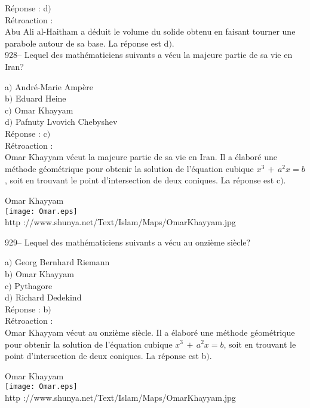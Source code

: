 ﻿\documentclass[letterpaper, 12pt]{article}
\begin{document}
R\'eponse : d$)$\\

R\'etroaction : \\
Abu Ali al-Haitham a d\'eduit le volume du solide obtenu en faisant tourner
une parabole autour de sa base. La r\'eponse est d$)$.\\

928-- Lequel des math\'ematiciens suivants a v\'ecu la majeure
partie de sa vie en Iran?

a$)$ Andr\'e-Marie Amp\`ere \\
b$)$ Eduard Heine \\
c$)$ Omar Khayyam \\
d$)$ Pafnuty Lvovich Chebyshev\\

R\'eponse : c$)$\\

R\'etroaction : \\
Omar Khayyam v\'ecut la majeure partie de sa vie en Iran. Il a
\'elabor\'e une m\'ethode g\'eom\'etrique pour obtenir la solution
de l'\'equation cubique $x^3\,+\,a^2x=b$,
soit en trouvant le point d'intersection de deux coniques. La r\'eponse est
c$)$.\\

        \begin{center}
        Omar Khayyam\\
    \texttt{[image: Omar.eps]}\\
        {\footnotesize http
://www.shunya.net/Text/Islam/Maps/OmarKhayyam.jpg}
    \end{center}

929-- Lequel des math\'ematiciens suivants a v\'ecu au onzi\`eme
si\`ecle?

a$)$ Georg Bernhard Riemann \\
b$)$ Omar Khayyam \\
c$)$ Pythagore \\
d$)$ Richard Dedekind\\

R\'eponse : b$)$\\

R\'etroaction :\\
Omar Khayyam v\'ecut au onzi\`eme si\`ecle. Il a \'elabor\'e une
m\'ethode g\'eom\'etrique pour obtenir
la solution de l'\'equation cubique $x^3\,+\,a^2x=b$, soit en trouvant le
point d'intersection de deux coniques. La r\'eponse est b$)$.\\

        \begin{center}
        Omar Khayyam\\
    \texttt{[image: Omar.eps]}\\
        {\footnotesize http
://www.shunya.net/Text/Islam/Maps/OmarKhayyam.jpg}
    \end{center}
\end{document}
